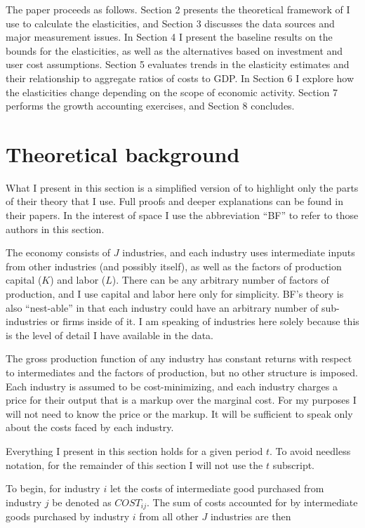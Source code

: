 \documentclass[11pt]{article}
\begin{document}
The paper proceeds as follows. Section 2 presents the theoretical framework of \cite{bfshortnote,bfprodge} I use to calculate the elasticities, and Section 3 discusses the data sources and major measurement issues. In Section 4 I present the baseline results on the bounds for the elasticities, as well as the alternatives based on investment and user cost assumptions. Section 5 evaluates trends in the elasticity estimates and their relationship to aggregate ratios of costs to GDP. In Section 6 I explore how the elasticities change depending on the scope of economic activity. Section 7 performs the growth accounting exercises, and Section 8 concludes.

\section{Theoretical background}
What I present in this section is a simplified version of \cite{bfshortnote,bfprodge} to highlight only the parts of their theory that I use. Full proofs and deeper explanations can be found in their papers. In the interest of space I use the abbreviation ``BF'' to refer to those authors in this section.

The economy consists of $J$ industries, and each industry uses intermediate inputs from other industries (and possibly itself), as well as the factors of production capital ($K$) and labor ($L$). There can be any arbitrary number of factors of production, and I use capital and labor here only for simplicity. BF's theory is also ``nest-able'' in that each industry could have an arbitrary number of sub-industries or firms inside of it. I am speaking of industries here solely because this is the level of detail I have available in the data. 

The gross production function of any industry has constant returns with respect to intermediates and the factors of production, but no other structure is imposed. Each industry is assumed to be cost-minimizing, and each industry charges a price for their output that is a markup over the marginal cost. For my purposes I will not need to know the price or the markup. It will be sufficient to speak only about the costs faced by each industry.

Everything I present in this section holds for a given period $t$. To avoid needless notation, for the remainder of this section I will not use the $t$ subscript. 

To begin, for industry $i$ let the costs of intermediate good purchased from industry $j$ be denoted as $COST_{ij}$. The sum of costs accounted for by intermediate goods purchased by industry $i$ from all other $J$ industries are then
\end{document}
